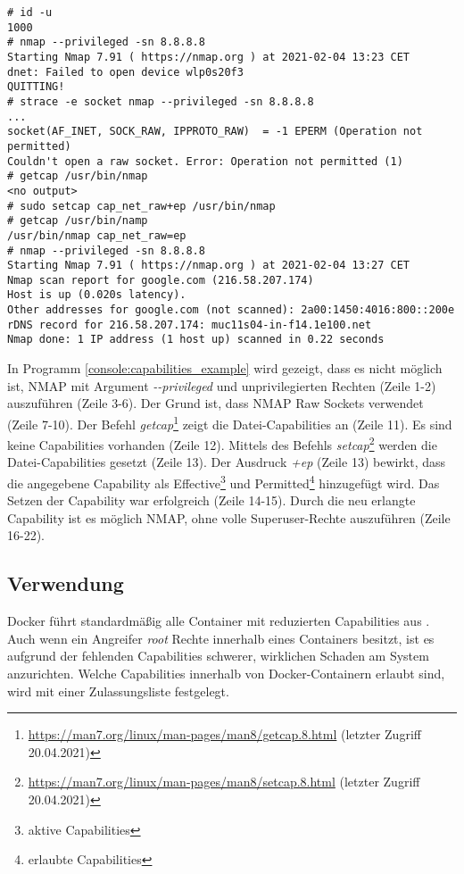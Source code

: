 \begin{lstlisting}[label={console:capabilities_example},caption={Beispiel für Capabilities}]
# id -u
1000
# nmap --privileged -sn 8.8.8.8
Starting Nmap 7.91 ( https://nmap.org ) at 2021-02-04 13:23 CET
dnet: Failed to open device wlp0s20f3
QUITTING!
# strace -e socket nmap --privileged -sn 8.8.8.8
...
socket(AF_INET, SOCK_RAW, IPPROTO_RAW)  = -1 EPERM (Operation not permitted)
Couldn't open a raw socket. Error: Operation not permitted (1)
# getcap /usr/bin/nmap
<no output>
# sudo setcap cap_net_raw+ep /usr/bin/nmap 
# getcap /usr/bin/namp
/usr/bin/nmap cap_net_raw=ep
# nmap --privileged -sn 8.8.8.8
Starting Nmap 7.91 ( https://nmap.org ) at 2021-02-04 13:27 CET
Nmap scan report for google.com (216.58.207.174)
Host is up (0.020s latency).
Other addresses for google.com (not scanned): 2a00:1450:4016:800::200e
rDNS record for 216.58.207.174: muc11s04-in-f14.1e100.net
Nmap done: 1 IP address (1 host up) scanned in 0.22 seconds
\end{lstlisting}

In Programm \ref{console:capabilities_example} wird gezeigt, dass es nicht
möglich ist, NMAP mit Argument \linebreak \mbox{\emph{-{}-privileged}} und
unprivilegierten Rechten (Zeile 1-2) auszuführen (Zeile 3-6). Der Grund
ist, dass NMAP Raw Sockets verwendet (Zeile 7-10). Der Befehl
\emph{getcap}\footnote{\url{https://man7.org/linux/man-pages/man8/getcap.8.html}
(letzter Zugriff 20.04.2021)} zeigt die Datei-Capabilities an (Zeile 11). Es
sind keine Capabilities vorhanden (Zeile 12). Mittels  des Befehls
\emph{setcap}\footnote{\url{https://man7.org/linux/man-pages/man8/setcap.8.html}
(letzter Zugriff 20.04.2021)} werden die Datei-Capabilities gesetzt (Zeile 13).
Der Ausdruck \emph{+ep} (Zeile 13) bewirkt, dass die angegebene Capability als
Effective\footnote{aktive Capabilities} und Permitted\footnote{erlaubte
Capabilities} hinzugefügt wird. Das Setzen der Capability war erfolgreich
(Zeile 14-15). Durch die neu erlangte Capability ist es möglich NMAP, ohne
volle Superuser-Rechte auszuführen (Zeile 16-22).

\subsection{Verwendung}
Docker führt standardmä{\ss}ig alle Container mit reduzierten Capabilities aus
\cite{docker_engine_security_capabilities}. Auch wenn ein Angreifer \emph{root}
Rechte innerhalb eines Containers besitzt, ist es aufgrund der fehlenden
Capabilities schwerer, wirklichen Schaden am System anzurichten. Welche
Capabilities innerhalb von Docker-Containern erlaubt sind, wird mit einer
Zulassungsliste festgelegt. 

